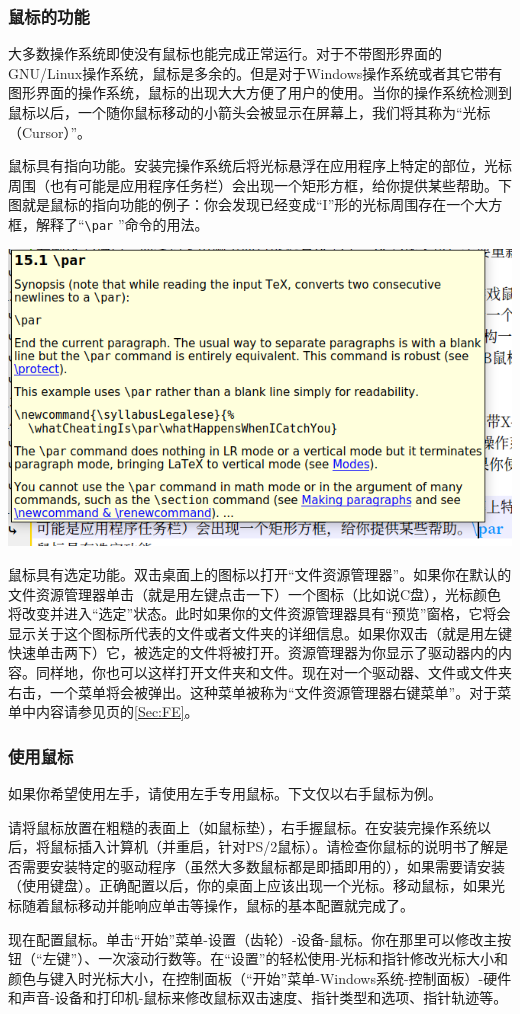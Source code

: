 \subsubsection{鼠标的功能}
大多数操作系统即使没有鼠标也能完成正常运行。对于不带图形界面的GNU/Linux操作系统，鼠标是多余的。但是对于Windows操作系统或者其它带有图形界面的操作系统，鼠标的出现大大方便了用户的使用。当你的操作系统检测到鼠标以后，一个随你鼠标移动的小箭头会被显示在屏幕上，我们将其称为“光标（Cursor）”。\par
鼠标具有指向功能。安装完操作系统后将光标悬浮在应用程序上特定的部位，光标周围（也有可能是应用程序任务栏）会出现一个矩形方框，给你提供某些帮助。下图就是鼠标的指向功能的例子：你会发现已经变成“I”形的光标周围存在一个大方框，解释了“\verb|\par| ”命令的用法。
\begin{center}
	\includegraphics{pic/Crusor}
\end{center}\par
鼠标具有选定功能。双击桌面上的图标以打开“文件资源管理器”。如果你在默认的文件资源管理器单击（就是用左键点击一下）一个图标（比如说C盘），光标颜色将改变并进入“选定”状态。此时如果你的文件资源管理器具有“预览”窗格，它将会显示关于这个图标所代表的文件或者文件夹的详细信息。如果你双击（就是用左键快速单击两下）它，被选定的文件将被打开。资源管理器为你显示了驱动器内的内容。同样地，你也可以这样打开文件夹和文件。现在对一个驱动器、文件或文件夹右击，一个菜单将会被弹出。这种菜单被称为“文件资源管理器右键菜单”。对于菜单中内容请参见\pageref{Sec:FE}页的\ref{Sec:FE}。
\subsubsection{使用鼠标}
如果你希望使用左手，请使用左手专用鼠标。下文仅以右手鼠标为例。\par
请将鼠标放置在粗糙的表面上（如鼠标垫），右手握鼠标。在安装完操作系统以后，将鼠标插入计算机（并重启，针对PS/2鼠标）。请检查你鼠标的说明书了解是否需要安装特定的驱动程序（虽然大多数鼠标都是即插即用的），如果需要请安装（使用键盘）。正确配置以后，你的桌面上应该出现一个光标。移动鼠标，如果光标随着鼠标移动并能响应单击等操作，鼠标的基本配置就完成了。\par
现在配置鼠标。单击“开始”菜单-设置（齿轮）-设备-鼠标。你在那里可以修改主按钮（“左键”）、一次滚动行数等。在“设置”的轻松使用-光标和指针修改光标大小和颜色与键入时光标大小，在控制面板（“开始”菜单-Windows系统-控制面板）-硬件和声音-设备和打印机-鼠标来修改鼠标双击速度、指针类型和选项、指针轨迹等。
